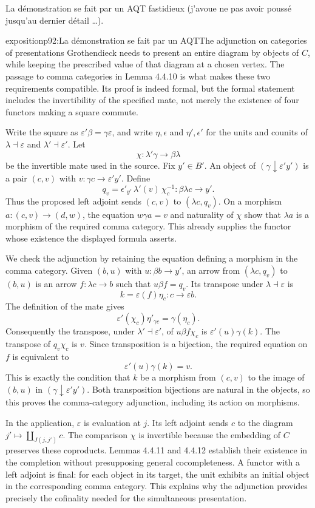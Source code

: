 La démonstration se fait par un AQT fastidieux (j'avoue ne pas avoir poussé jusqu'au dernier détail \ldots).

\begin{dcomment}{exposition}{p92:La démonstration se fait par un AQT}{The adjunction on categories of presentations}
Grothendieck needs to present an entire diagram by objects of $C$, while keeping the prescribed value of that diagram at a chosen vertex. The passage to comma categories in Lemma 4.4.10 is what makes these two requirements compatible. Its proof is indeed formal, but the formal statement includes the invertibility of the specified mate, not merely the existence of four functors making a square commute.

Write the square as $\varepsilon'\beta=\gamma\varepsilon$, and write $\eta,\epsilon$ and $\eta',\epsilon'$ for the units and counits of $\lambda\dashv\varepsilon$ and $\lambda'\dashv\varepsilon'$. Let
\[
\chi:\lambda'\gamma\longrightarrow\beta\lambda
\]
be the invertible mate used in the source. Fix $y'\in B'$. An object of $(\gamma\downarrow\varepsilon'y')$ is a pair $(c,v)$ with $v:\gamma c\to\varepsilon'y'$. Define
\[
q_v=\epsilon'_{y'}\,\lambda'(v)\,\chi_c^{-1}:
\beta\lambda c\longrightarrow y'.
\]
Thus the proposed left adjoint sends $(c,v)$ to $(\lambda c,q_v)$. On a morphism $a:(c,v)\to(d,w)$, the equation $w\gamma a=v$ and naturality of $\chi$ show that $\lambda a$ is a morphism of the required comma category. This already supplies the functor whose existence the displayed formula asserts.

We check the adjunction by retaining the equation defining a morphism in the comma category. Given $(b,u)$ with $u:\beta b\to y'$, an arrow from $(\lambda c,q_v)$ to $(b,u)$ is an arrow $f:\lambda c\to b$ such that $u\beta f=q_v$. Its transpose under $\lambda\dashv\varepsilon$ is
\[
k=\varepsilon(f)\eta_c:c\longrightarrow\varepsilon b.
\]
The definition of the mate gives
\[
\varepsilon'(\chi_c)\eta'_{\gamma c}=\gamma(\eta_c).
\]
Consequently the transpose, under $\lambda'\dashv\varepsilon'$, of $u\beta f\chi_c$ is $\varepsilon'(u)\gamma(k)$. The transpose of $q_v\chi_c$ is $v$. Since transposition is a bijection, the required equation on $f$ is equivalent to
\[
\varepsilon'(u)\gamma(k)=v.
\]
This is exactly the condition that $k$ be a morphism from $(c,v)$ to the image of $(b,u)$ in $(\gamma\downarrow\varepsilon'y')$. Both transposition bijections are natural in the objects, so this proves the comma-category adjunction, including its action on morphisms.

In the application, $\varepsilon$ is evaluation at $j$. Its left adjoint sends $c$ to the diagram $j'\mapsto\coprod_{J(j,j')}c$. The comparison $\chi$ is invertible because the embedding of $C$ preserves these coproducts. Lemmas 4.4.11 and 4.4.12 establish their existence in the completion without presupposing general cocompleteness. A functor with a left adjoint is final: for each object in its target, the unit exhibits an initial object in the corresponding comma category. This explains why the adjunction provides precisely the cofinality needed for the simultaneous presentation.
\end{dcomment}


